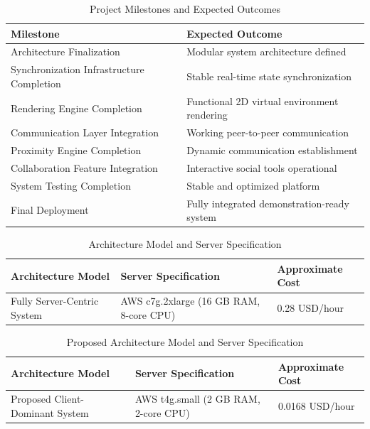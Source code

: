 \documentclass[12pt]{article}
\begin{document}
\begin{table}[h!]
\centering
\renewcommand{\arraystretch}{1.5}
\begin{tabular}{|p{6cm}|p{8cm}|}
\hline
\textbf{Milestone} & \textbf{Expected Outcome} \\ 
\hline

Architecture Finalization & Modular system architecture defined \\ 
\hline

Synchronization Infrastructure Completion & Stable real-time state synchronization \\ 
\hline

Rendering Engine Completion & Functional 2D virtual environment rendering \\ 
\hline

Communication Layer Integration & Working peer-to-peer communication \\ 
\hline

Proximity Engine Completion & Dynamic communication establishment \\ 
\hline

Collaboration Feature Integration & Interactive social tools operational \\ 
\hline

System Testing Completion & Stable and optimized platform \\ 
\hline

Final Deployment & Fully integrated demonstration-ready system \\ 
\hline

\end{tabular}
\caption{Project Milestones and Expected Outcomes}

\end{table}
\begin{table}[h!]
\centering
\renewcommand{\arraystretch}{1.5}
\begin{tabular}{|p{6cm}|p{6cm}|p{4cm}|}
\hline
\textbf{Architecture Model} & \textbf{Server Specification} & \textbf{Approximate Cost} \\ 
\hline

Fully Server-Centric System & AWS c7g.2xlarge (16 GB RAM, 8-core CPU) & 0.28 USD/hour \\ 
\hline

\end{tabular}
\caption{Architecture Model and Server Specification}

\end{table}

\begin{table}[h!]
\centering
\renewcommand{\arraystretch}{1.5}
\begin{tabular}{|p{6cm}|p{6cm}|p{4cm}|}
\hline
\textbf{Architecture Model} & \textbf{Server Specification} & \textbf{Approximate Cost} \\ 
\hline

Proposed Client-Dominant System & AWS t4g.small (2 GB RAM, 2-core CPU) & 0.0168 USD/hour \\ 
\hline

\end{tabular}
\caption{Proposed Architecture Model and Server Specification}

\end{table}
\end{document}
